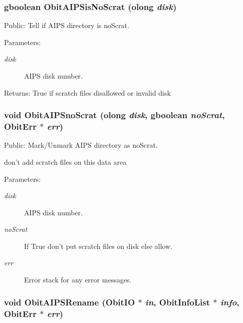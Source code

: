 \subsubsection{\setlength{\rightskip}{0pt plus 5cm}gboolean Obit\-AIPSis\-No\-Scrat ({\bf olong} {\em disk})}\label{ObitAIPS_8h_a28}


Public: Tell if AIPS directory is no\-Scrat. 

\begin{Desc}
\item[Parameters:]
\begin{description}
\item[{\em disk}]AIPS disk number. \end{description}
\end{Desc}
\begin{Desc}
\item[Returns:]True if scratch files disallowed or invalid disk \end{Desc}
\subsubsection{\setlength{\rightskip}{0pt plus 5cm}void Obit\-AIPSno\-Scrat ({\bf olong} {\em disk}, gboolean {\em no\-Scrat}, {\bf Obit\-Err} $\ast$ {\em err})}\label{ObitAIPS_8h_a27}


Public: Mark/Unmark AIPS directory as no\-Scrat. 

don't add scratch files on this data area \begin{Desc}
\item[Parameters:]
\begin{description}
\item[{\em disk}]AIPS disk number. \item[{\em no\-Scrat}]If True don't put scratch files on disk else allow. \item[{\em err}]Error stack for any error messages. \end{description}
\end{Desc}
\subsubsection{\setlength{\rightskip}{0pt plus 5cm}void Obit\-AIPSRename ({\bf Obit\-IO} $\ast$ {\em in}, {\bf Obit\-Info\-List} $\ast$ {\em info}, {\bf Obit\-Err} $\ast$ {\em err})}\label{ObitAIPS_8h_a24}


